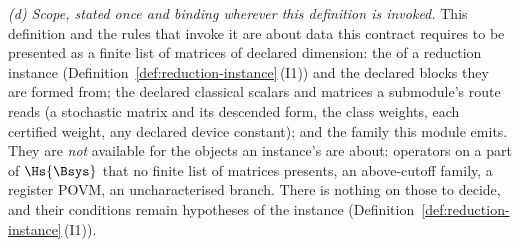 \begin{definition}
\emph{(d) Scope, stated once and binding wherever this definition is
invoked.} This definition and the rules that invoke it are about data this
contract requires to be presented as a finite list of matrices of declared
dimension: the  of a reduction instance
(Definition~\ref{def:reduction-instance}\,(I1)) and the declared blocks they
are formed from; the declared classical scalars and matrices a submodule's
route reads (a stochastic matrix and its descended form, the class weights,
each certified weight, any declared device constant); and the family this
module emits. They are \emph{not} available for the objects an instance's
 are about: operators on a part of $\Hs{\Bsys}$ that no
finite list of matrices presents, an above-cutoff family, a register POVM, an
uncharacterised branch. There is nothing on those to decide, and their
conditions remain hypotheses of the instance
(Definition~\ref{def:reduction-instance}\,(I1)).
\end{definition}

